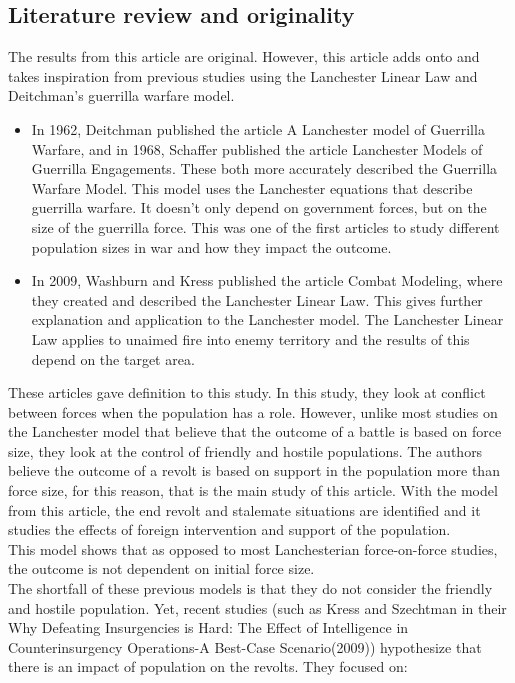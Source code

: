 \documentclass{article}
\begin{document}
\subsection{Literature review and originality}
The results from this article are original. However, this article adds onto and takes inspiration from previous studies using the Lanchester Linear Law and Deitchman’s guerrilla warfare model.
\begin{itemize}
    \item In 1962, Deitchman published the article A Lanchester model of Guerrilla Warfare\cite{deitchman1962lanchester}, and in 1968, Schaffer published the article Lanchester Models of Guerrilla Engagements\cite{schaffer1968lanchester}. These both more accurately described the Guerrilla Warfare Model. This model uses the Lanchester equations that describe guerrilla warfare. It doesn’t only depend on government forces, but on the size of the guerrilla force. This was one of the first articles to study different population sizes in war and how they impact the outcome.
    \item In 2009, Washburn and Kress published the article Combat Modeling\cite{washburn2009combat}, where they created and described the Lanchester Linear Law. This gives further explanation and application to the Lanchester model. The Lanchester Linear Law applies to unaimed fire into enemy territory and the results of this depend on the target area.
\end{itemize}
These articles gave definition to this study. In this study, they look at conflict between forces when the population has a role. However, unlike most studies on the Lanchester model that believe that the outcome of a battle is based on force size, they look at the control of friendly and hostile populations. The authors believe the outcome of a revolt is based on support in the population more than force size, for this reason, that is the main study of this article. With the model from this article, the end revolt and stalemate situations are identified and it studies the effects of foreign intervention and support of the population.
\medskip
\\This model shows that as opposed to most Lanchesterian force-on-force studies, the outcome is not dependent on initial force size.
\medskip
\\The shortfall of these previous models is that they do not consider the friendly and hostile population. Yet, recent studies (such as Kress and Szechtman in their Why Defeating Insurgencies is Hard: The Effect of Intelligence in Counterinsurgency Operations-A Best-Case Scenario(2009)\cite{kress2009defeating}) hypothesize that there is an impact of population on the revolts. They focused on: 
\end{document}
